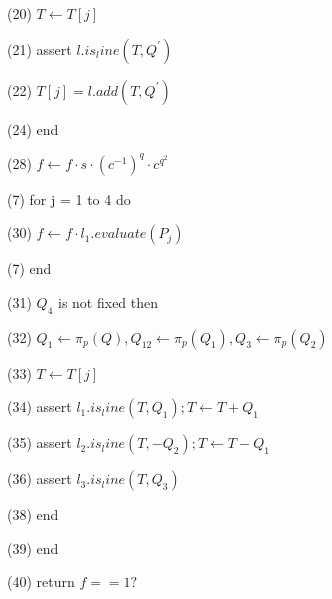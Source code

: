 (20) \indent \indent  $\displaystyle T \leftarrow T[j] $ 

(21) \indent \indent  assert $\displaystyle l.is_line(T, Q^{'}) $ 

(22) \indent \indent  $\displaystyle T[j] = l.add(T, Q^{'}) $ 

(24) \indent  end 

(28) \indent  $\displaystyle f \leftarrow f \cdot s \cdot (c^{-1})^q \cdot c^{q^2} $ 

(7) \indent \indent for j = 1 to 4 do 

(30) \indent \indent $\displaystyle f \leftarrow f \cdot l_1.evaluate(P_{j}) $ 

(7) \indent \indent end 

(31) \indent \indent $Q_4$ is not fixed then 

(32) \indent \indent  $\displaystyle Q_1 \leftarrow \pi_p(Q), Q_12\leftarrow \pi_p(Q_1), Q_3 \leftarrow \pi_p(Q_2) $ 

(33) \indent \indent  $\displaystyle T \leftarrow T[j] $ 

(34) \indent \indent  assert $\displaystyle l_1.is_line(T, Q_1); T \leftarrow T + Q_1 $ 

(35) \indent \indent  assert $\displaystyle l_2.is_line(T, -Q_2); T \leftarrow T - Q_1 $ 

(36) \indent \indent  assert $\displaystyle l_3.is_line(T, Q_3) $ 

(38) \indent end 

(39) end 

(40) return $\displaystyle f == 1? $ 